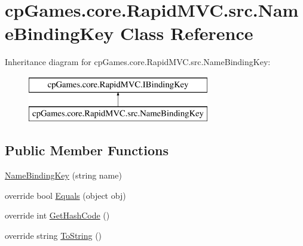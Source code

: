 \hypertarget{classcp_games_1_1core_1_1_rapid_m_v_c_1_1src_1_1_name_binding_key}{}\section{cp\+Games.\+core.\+Rapid\+M\+V\+C.\+src.\+Name\+Binding\+Key Class Reference}
\label{classcp_games_1_1core_1_1_rapid_m_v_c_1_1src_1_1_name_binding_key}
Inheritance diagram for cp\+Games.\+core.\+Rapid\+M\+V\+C.\+src.\+Name\+Binding\+Key\+:\begin{figure}[H]
\begin{center}
\leavevmode
\includegraphics[height=2.000000cm]{classcp_games_1_1core_1_1_rapid_m_v_c_1_1src_1_1_name_binding_key}
\end{center}
\end{figure}
\subsection*{Public Member Functions}
\begin{DoxyCompactItemize}
\item 
\mbox{\hyperlink{classcp_games_1_1core_1_1_rapid_m_v_c_1_1src_1_1_name_binding_key_a07b41734606cb97a07b15c26d463bbba}{Name\+Binding\+Key}} (string name)
\item 
override bool \mbox{\hyperlink{classcp_games_1_1core_1_1_rapid_m_v_c_1_1src_1_1_name_binding_key_aadb92be16b88b244adcec18fcd2c83e8}{Equals}} (object obj)
\item 
override int \mbox{\hyperlink{classcp_games_1_1core_1_1_rapid_m_v_c_1_1src_1_1_name_binding_key_a27533a5b2fd5deda8e96d1af7c98f40d}{Get\+Hash\+Code}} ()
\item 
override string \mbox{\hyperlink{classcp_games_1_1core_1_1_rapid_m_v_c_1_1src_1_1_name_binding_key_acb33fd1833d1627904e79801ca205a63}{To\+String}} ()
\end{DoxyCompactItemize}
